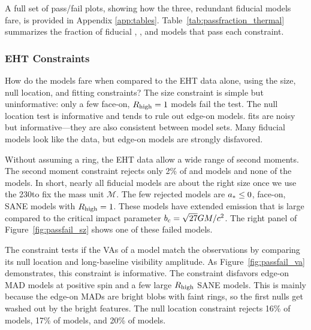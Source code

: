 A full set of pass/fail plots, showing how the three, redundant fiducial models fare, is provided in Appendix \ref{app:tables}.
Table~\ref{tab:passfraction_thermal} summarizes the fraction of fiducial \kharma, \bhac, and \hamr models that pass each constraint.

\subsubsection{EHT Constraints}

How do the models fare when compared to the EHT data alone, using the size, null location, and \mring fitting constraints?  The size constraint is simple but uninformative: only a few face-on, $R_\mathrm{high} = 1$ models fail the test.
The null location test is informative and tends to rule out edge-on models.
\Mring fits are noisy but informative---they are also consistent between model sets.
Many fiducial models look like the data, but edge-on models are strongly disfavored.


Without assuming a ring, the EHT data allow a wide range of second moments.
The second moment constraint rejects only 2\% of \kharma and \bhac models and none of the \hamr models.
In short, nearly all fiducial models are about the right size once we use the 230\GHz to fix the mass unit $\mathcal{M}$.
The few rejected models are $a_* \le 0$, face-on, SANE models with $R_\mathrm{high} = 1$.
These models have extended emission that is large compared to the critical impact parameter $b_c = \sqrt{27}GM/c^2$.
The right panel of Figure~\ref{fig:passfail_sz} shows one of these failed models.

\label{sec:vam}

The \vam constraint tests if the VAs of a model match the
observations by comparing its null location and long-baseline visibility
amplitude.
As Figure~\ref{fig:passfail_va} demonstrates, this constraint is
informative.
The constraint disfavors edge-on MAD models at positive spin and a few large $R_\mathrm{high}$ SANE models.
This is mainly because the edge-on MADs are bright blobs with faint rings, so the first nulls get washed out by the bright features.
The null location constraint rejects 16\% of \kharma models, 17\% of \bhac models, and 20\% of \hamr models.

